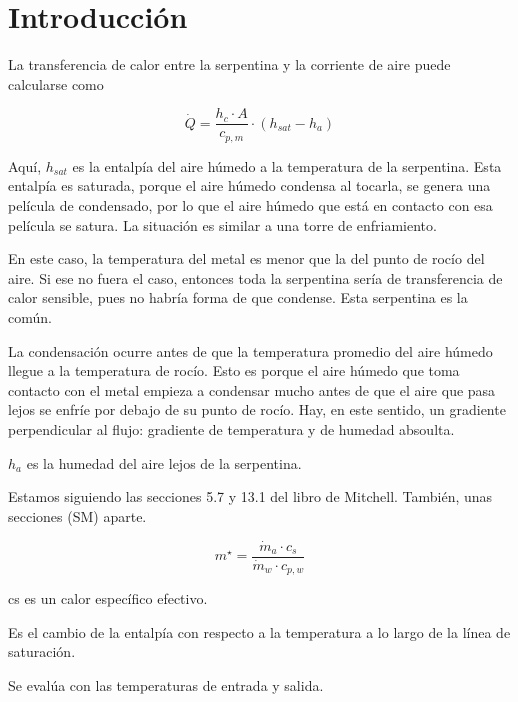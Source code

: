 \section{Introducción}

La transferencia de calor entre la serpentina y la corriente de aire puede calcularse como

     \begin{equation}
          \dot{Q} = \frac{h_c \cdot A}{c_{p,m}}\cdot\left(h_{sat} - h_a \right)
     \end{equation}

Aquí, $h_{sat}$ es la entalpía del aire húmedo a la temperatura de la serpentina. Esta entalpía es saturada, porque el aire húmedo condensa al tocarla, se genera una película de condensado, por lo que el aire húmedo que está en contacto con esa película se satura. La situación es similar a una torre de enfriamiento.

En este caso, la temperatura del metal es menor que la del punto de rocío del aire. Si ese no fuera el caso, entonces toda la serpentina sería de transferencia de calor sensible, pues no habría forma de que condense. Esta serpentina es la común.

La condensación ocurre antes de que la temperatura promedio del aire húmedo llegue a la temperatura de rocío. Esto es porque el aire húmedo que toma contacto con el metal empieza a condensar mucho antes de que el aire que pasa lejos se enfríe por debajo de su punto de rocío. Hay, en este sentido, un gradiente perpendicular al flujo: gradiente de temperatura y de humedad absoulta.

$h_a$ es la humedad del aire lejos de la serpentina.

Estamos siguiendo las secciones 5.7 y 13.1 del libro de Mitchell. También, unas secciones (SM) aparte.



\begin{equation}
     m^{\star}=\frac{\dot{m}_a \cdot c_s}{\dot{m}_w \cdot c_{p,w}}
\end{equation}

cs  es un calor específico efectivo.

Es el cambio de la entalpía con respecto a la temperatura a lo largo de la línea de saturación.

Se evalúa con las temperaturas de entrada y salida.

